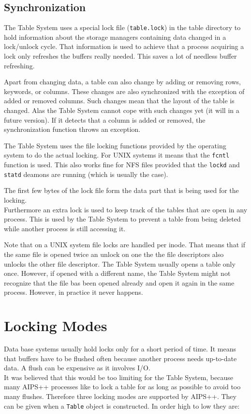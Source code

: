 \subsection{Synchronization}
The Table System uses a special lock file (\texttt{table.lock}) in the table
directory to hold information about the storage managers containing
data changed in a lock/unlock cycle. That information is used to
achieve that a process acquiring a lock only refreshes the buffers
really needed. This saves a lot of needless buffer refreshing.

Apart from changing data, a table can also change by adding or
removing rows, keywords, or columns. These changes are also
synchronized with the exception of added or removed columns. Such
changes mean that the layout of the table is changed. Alas the Table
System cannot cope with such changes yet (it will in a future
version). If it detects that a column is added or removed, the
synchronization function throws an exception.

\medskip
The Table System uses the file locking functions provided by the
operating system
to do the actual locking. For UNIX systems it means that the
\texttt{fcntl} function is used. This also works fine for NFS files
provided that the \texttt{lockd} and \texttt{statd} deamons are
running (which is usually the case).

The first few bytes of the lock file form the data part
that is being used for the locking.
\\Furthermore an extra lock is used to keep track of the tables that are
open in any process. This is used by the Table System to prevent
a table from being deleted while another process is still accessing
it.

\medskip
Note that on a UNIX system file locks are handled per inode. That
means that if the same file is opened twice an unlock on one the the
file descriptors also unlocks the other file descriptor.
The Table System usually opens a table only once. However, if opened
with a different name, the Table System might not recognize that
the file bas been opened already and open it again in the same process.
However, in practice it never happens.


\section{\label{TABLELOCK:LOCKINGMODES}Locking Modes}
Data base systems usually hold locks only for a short period of time. It means
that buffers have to be flushed often because another process needs
up-to-date data. A flush can be expensive as it involves I/O.
\\It was believed that this would be too limiting for the Table
System, because many AIPS++ processes like to lock a table for as
long as possible to avoid too many flushes.
Therefore three locking modes are supported by AIPS++. They can be
given when a \texttt{Table} object is constructed. In order high to low
they are:

